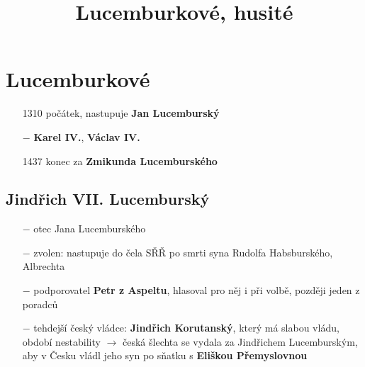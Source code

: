 \documentclass{article}
\title{\vspace{-2cm}Lucemburkové, husité\vspace{-1.7cm}}
\date{}
\author{}
\begin{document}
\maketitle

\section*{Lucemburkové}


\begin{itemize}
    \vspace{-0.5em}
    \setlength\itemsep{0.15em}
    \item[1310] počátek, nastupuje \textbf{Jan Lucemburský}
    \item[$-$] \textbf{Karel IV.}, \textbf{Václav IV.}
    \item[1437] konec za \textbf{Zmikunda Lucemburského}
\end{itemize}

\subsection*{Jindřich VII. Lucemburský}
\begin{itemize}
    \vspace{-0.5em}
    \setlength\itemsep{0.15em}
    \item[$-$] otec Jana Lucemburského
    \item[$-$] zvolen: nastupuje do čela SŘŘ po smrti syna Rudolfa Habsburského, Albrechta
    \item[$-$] podporovatel \textbf{Petr z Aspeltu}, hlasoval pro něj i při volbě, později jeden z poradců
    \item[$-$] tehdejší český vládce: \textbf{Jindřich Korutanský}, který má slabou vládu, období nestability $\rightarrow$ česká šlechta se vydala za Jindřichem Lucemburským, aby v Česku vládl jeho syn po sňatku s \textbf{Eliškou Přemyslovnou}
\end{itemize}
\end{document}
